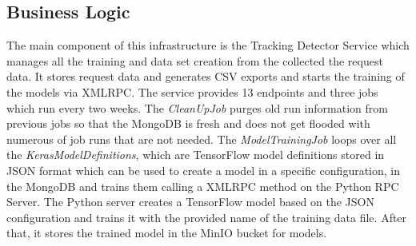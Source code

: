 \subsection{Business Logic}
\label{sec:bl1}

The main component of this infrastructure is the Tracking Detector Service which manages all the training and data set creation from the collected
the request data. It stores request data and generates CSV exports and starts the training of the models via XMLRPC. The service provides
13 endpoints and three jobs which run every two weeks. 
The \emph{CleanUpJob} purges old run information from previous jobs so that the MongoDB is fresh and does not get
flooded with numerous of job runs that are not needed. The \emph{ModelTrainingJob} loops over all the \emph{KerasModelDefinitions}, which are TensorFlow
model definitions stored in JSON format which can be used to create a model in a specific configuration, in the MongoDB
and trains them calling a XMLRPC method on the Python RPC Server. The Python server creates a TensorFlow model based on the JSON 
configuration and trains it with the provided name of the training data file. After that, it stores the trained model in the MinIO
bucket for models. 

